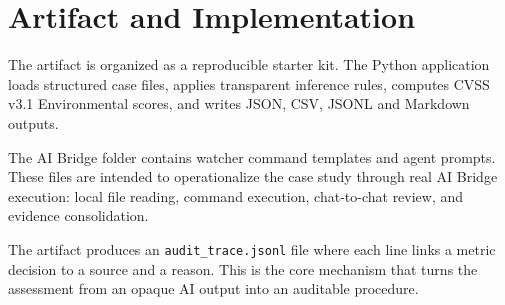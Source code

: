 \section{Artifact and Implementation}

The artifact is organized as a reproducible starter kit. The Python application
loads structured case files, applies transparent inference rules, computes CVSS
v3.1 Environmental scores, and writes JSON, CSV, JSONL and Markdown outputs.

The AI Bridge folder contains watcher command templates and agent prompts. These
files are intended to operationalize the case study through real AI Bridge
execution: local file reading, command execution, chat-to-chat review, and
evidence consolidation.

The artifact produces an \texttt{audit\_trace.jsonl} file where each line links a
metric decision to a source and a reason. This is the core mechanism that turns
the assessment from an opaque AI output into an auditable procedure.
